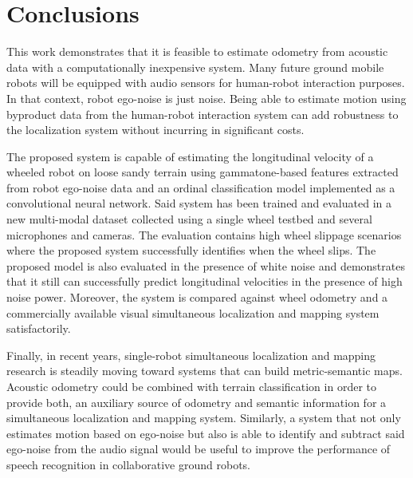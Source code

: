 \section{Conclusions} \label{chap:conclusions}

This work demonstrates that it is feasible to estimate odometry from acoustic
data with a computationally inexpensive system. Many future ground mobile
robots will be equipped with audio sensors for human-robot interaction
purposes. In that context, robot ego-noise is just noise. Being able to
estimate motion using byproduct data from the human-robot interaction system
can add robustness to the localization system without incurring in significant
costs.

The proposed system is capable of estimating the longitudinal velocity of a
wheeled robot on loose sandy terrain using gammatone-based features extracted
from robot ego-noise data and an ordinal classification model implemented as a
convolutional neural network. Said system has been trained and evaluated in a
new multi-modal dataset collected using a single wheel testbed and several
microphones and cameras. The evaluation contains high wheel slippage scenarios
where the proposed system successfully identifies when the wheel slips. The
proposed model is also evaluated in the presence of white noise and
demonstrates that it still can successfully predict longitudinal velocities in
the presence of high noise power. Moreover, the system is compared against
wheel odometry and a commercially available visual simultaneous localization
and mapping system satisfactorily.

Finally, in recent years, single-robot simultaneous localization and mapping
research is steadily moving toward systems that can build metric-semantic maps.
Acoustic odometry could be combined with terrain classification in order to
provide both, an auxiliary source of odometry and semantic information for a
simultaneous localization and mapping system. Similarly, a system that not only
estimates motion based on ego-noise but also is able to identify and subtract
said ego-noise from the audio signal would be useful to improve the performance
of speech recognition in collaborative ground robots. 

